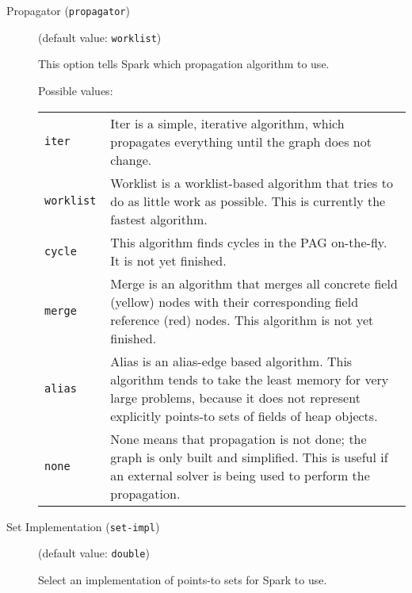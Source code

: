 \documentclass{article}
\begin{document}
\begin{description}

\item[Propagator ({\tt propagator})]
(default value: {\tt worklist})




This option tells Spark which propagation algorithm to use.
        



Possible values:\\
\begin{longtable}{p{1in}p{4in}}

{\tt iter }
&

Iter is a simple, iterative algorithm, which propagates everything until the
graph does not change.
\\

{\tt worklist }
&

Worklist is a worklist-based algorithm that tries
to do as little work as possible. This is currently the fastest algorithm.
\\

{\tt cycle }
&
This algorithm finds cycles in the PAG on-the-fly. It is not yet finished.\\

{\tt merge }
&

Merge is an algorithm that merges all concrete field (yellow) nodes with their corresponding
field reference (red) nodes. This algorithm is not yet finished.
\\

{\tt alias }
&

Alias is an alias-edge based algorithm. This algorithm tends to take
the least memory for very large problems, because it does not represent
explicitly points-to sets of fields of heap objects.
\\

{\tt none }
&

None means that propagation is not done; the graph is only built and
simplified. This is useful if an external solver is being used to perform the
propagation.
\\

\end{longtable}


\item[Set Implementation ({\tt set-impl})]
(default value: {\tt double})




Select an implementation of points-to sets for Spark to use.





\end{description}
\end{document}
